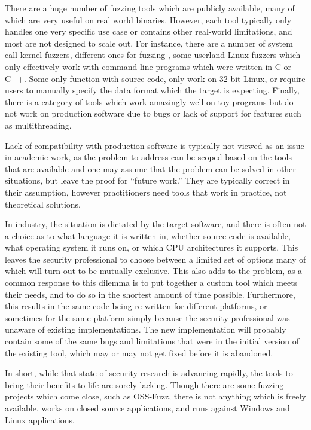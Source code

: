 There are a huge number of fuzzing tools\cite{afl,aflosx,winafl,peach22,syzkaller,ossfuzz,driller,radamsa,ni,zzuf,synfuzz,brundlefuzz,honggfuzz,kafl} which are publicly available, many of
which are very useful on real world binaries.
However, each tool
typically only handles one very specific use case or contains other real-world limitations, and most are not designed to scale
out.  For instance, there are a number of system call kernel fuzzers\cite{syzkaller,trinity,kafl,osxfuzz}, different ones for
fuzzing \IOCTLs{}\cite{ioctlfuzzer,ioctlbf}, some userland Linux fuzzers which only effectively work with
command line programs which were written in C or C++.  Some only function with
source code, only work on 32-bit Linux, or require users to manually specify 
the data format which the target is
expecting.  Finally, there is a category of tools which work amazingly well
on toy programs but do not work on production software due to bugs or lack of
support for features such as multithreading.

Lack of compatibility with production software is typically not viewed as an issue in academic work, as the problem to address can be
scoped based on the tools that are available and one may assume that the problem can
be solved in other situations, but leave the proof for ``future work.''  They
are typically correct in their assumption, however practitioners need tools
that work in practice, not theoretical solutions.

In industry, the situation is dictated by the target software,
and there is often not a choice as to what language it is
written in, whether source code is available, what operating system it runs
on, or which CPU architectures it supports. This leaves the security
professional to choose between a limited set of options many of which will
turn out to be mutually exclusive. This also adds to the problem, as a common
response to this dilemma is to put together a custom tool which meets their
needs, and to do so in the shortest amount of time possible.  Furthermore,
this results in the same code being re-written for different platforms, or
sometimes for the same platform simply because the security professional was
unaware of existing implementations.  The new implementation will probably
contain some of the same bugs and limitations that were in the initial
version of the existing tool, which may or may not get fixed before it is
abandoned.

In short, while that state of security research is advancing rapidly, the
tools to bring their benefits to life are sorely lacking.  Though there are some
fuzzing projects which come close, such as OSS-Fuzz,\cite{ossfuzz} there
is not anything which is freely available, works on closed source applications,
and runs against Windows and Linux applications.
